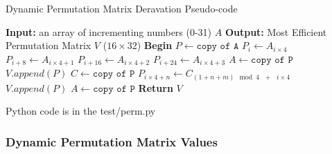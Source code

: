 \documentclass[fleqn, a4paper,12pt]{article}
\begin{document}
\begin{algorithm}
\caption{Dynamic Permutation Matrix Deravation Pseudo-code}
\begin{algorithmic}[1]  %
\State \textbf{Input:} an array of incrementing numbers (0-31) $A$ 
\State \textbf{Output:} Most Efficient Permutation Matrix $V$ ($16 \times 32$)
\State \textbf{Begin}
\State $P \gets \texttt{copy of A}$
		\State $P_i      \gets A_{i \times 4}$
		\State $P_{i+8}  \gets A_{i \times 4 + 1}$
		\State $P_{i+16} \gets A_{i \times 4 + 2}$
		\State $P_{i+24} \gets A_{i \times 4 + 3}$
	\EndFor
	\State $A \gets \texttt{copy of P}$
	\State $V.append(P)$
	\State $C \gets \texttt{copy of P}$
			\State $P_{i \times 4 + n} \gets C_{(1+n+m) \mod{4} \texttt{    } + \texttt{    } i \times 4}$
			\EndFor
		\EndFor
		\State $V.append(P)$
	\EndFor
	\State $A \gets \texttt{copy of P}$
\EndFor
\State \textbf{Return} $V$
\end{algorithmic}
\end{algorithm}

Python code is in the test/perm.py

 
\subsubsection{Dynamic Permutation Matrix Values} %

\renewcommand{\arraystretch}{1} %
\end{document}
